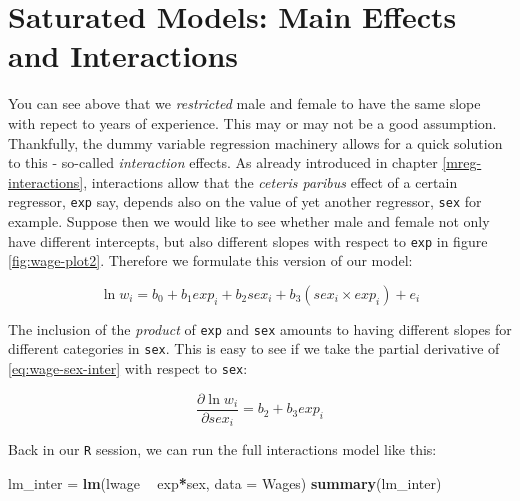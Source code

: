 \documentclass[]{book}
\newenvironment{Shaded}{\begin{snugshade}}{\end{snugshade}}
\newcommand{\KeywordTok}[1]{\textcolor[rgb]{0.13,0.29,0.53}{\textbf{#1}}}
\newcommand{\DataTypeTok}[1]{\textcolor[rgb]{0.13,0.29,0.53}{#1}}
\newcommand{\StringTok}[1]{\textcolor[rgb]{0.31,0.60,0.02}{#1}}
\newcommand{\OperatorTok}[1]{\textcolor[rgb]{0.81,0.36,0.00}{\textbf{#1}}}
\newcommand{\NormalTok}[1]{#1}
\begin{document}
\section{Saturated Models: Main Effects and
Interactions}\label{saturated-models-main-effects-and-interactions}

You can see above that we \emph{restricted} male and female to have the
same slope with repect to years of experience. This may or may not be a
good assumption. Thankfully, the dummy variable regression machinery
allows for a quick solution to this - so-called \emph{interaction}
effects. As already introduced in chapter \ref{mreg-interactions},
interactions allow that the \emph{ceteris paribus} effect of a certain
regressor, \texttt{exp} say, depends also on the value of yet another
regressor, \texttt{sex} for example. Suppose then we would like to see
whether male and female not only have different intercepts, but also
different slopes with respect to \texttt{exp} in figure
\ref{fig:wage-plot2}. Therefore we formulate this version of our model:

\begin{equation}
\ln w_i = b_0 + b_1 exp_i + b_2 sex_i + b_3 (sex_i \times exp_i) + e_i \label{eq:wage-sex-inter}
\end{equation}

The inclusion of the \emph{product} of \texttt{exp} and \texttt{sex}
amounts to having different slopes for different categories in
\texttt{sex}. This is easy to see if we take the partial derivative of
\eqref{eq:wage-sex-inter} with respect to \texttt{sex}:

\begin{equation}
\frac{\partial \ln w_i}{\partial sex_i} = b_2 + b_3 exp_i \label{eq:wage-sex-inter-deriv}
\end{equation}

Back in our \texttt{R} session, we can run the full interactions model
like this:

\begin{Shaded}
\begin{Highlighting}[]
\NormalTok{lm_inter =}\StringTok{ }\KeywordTok{lm}\NormalTok{(lwage }\OperatorTok{~}\StringTok{ }\NormalTok{exp}\OperatorTok{*}\NormalTok{sex, }\DataTypeTok{data =}\NormalTok{ Wages)}
\KeywordTok{summary}\NormalTok{(lm_inter)}
\end{Highlighting}
\end{Shaded}
\end{document}
